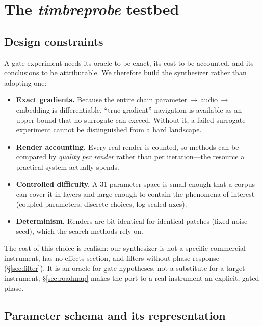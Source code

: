 \documentclass[11pt]{article}
\begin{document}
\section{The \emph{timbreprobe} testbed}\label{sec:testbed}

\subsection{Design constraints}

A gate experiment needs its oracle to be exact, its cost to be accounted, and
its conclusions to be attributable. We therefore build the synthesizer rather
than adopting one:

\begin{itemize}
\item \textbf{Exact gradients.} Because the entire chain
  parameter\,$\rightarrow$\,audio\,$\rightarrow$\,embedding is differentiable,
  ``true gradient'' navigation is available as an upper bound that no surrogate
  can exceed. Without it, a failed surrogate experiment cannot be distinguished
  from a hard landscape.
\item \textbf{Render accounting.} Every real render is counted, so methods can be
  compared by \emph{quality per render} rather than per iteration---the resource
  a practical system actually spends.
\item \textbf{Controlled difficulty.} A 31-parameter space is small enough that
  a corpus can cover it in layers and large enough to contain the phenomena of
  interest (coupled parameters, discrete choices, log-scaled axes).
\item \textbf{Determinism.} Renders are bit-identical for identical patches
  (fixed noise seed), which the search methods rely on.
\end{itemize}

The cost of this choice is realism: our synthesizer is not a specific
commercial instrument, has no effects section, and filters without phase
response (\S\ref{sec:filter}). It is an oracle for gate hypotheses, not a
substitute for a target instrument; \S\ref{sec:roadmap} makes the port to a real
instrument an explicit, gated phase.

\subsection{Parameter schema and its representation}\label{sec:schema}
\end{document}
